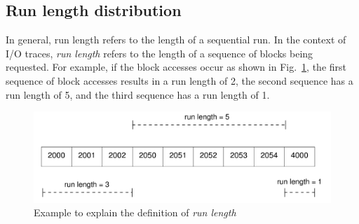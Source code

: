 

\subsection{Run length distribution}
In general, run length refers to the length of a sequential run. In the
context of I/O traces, \textit{run length} refers to the length of 
a sequence of blocks being requested. For example, if the block accesses
occur as shown in Fig.~\ref{fig:runlength-example}, the first sequence
of block accesses results in a run length of 2, the second sequence has
a run length of 5, and the third sequence has a run length of 1. 

\begin{figure}
	\centering
	\includegraphics[scale=0.55]{tracechar-figures/21-day/runlength-example.pdf}
	\caption{Example to explain the definition of \textit{run length}}
	\label{fig:runlength-example}
\end{figure}

